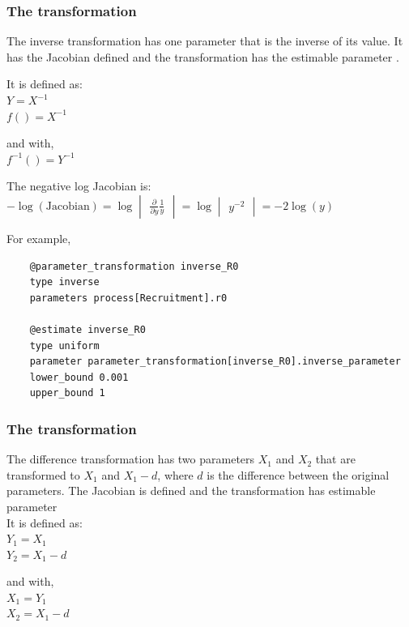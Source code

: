 \subsubsection{The  transformation} \label{sec:Transformation-Inverse}

The inverse transformation has one parameter that is the inverse of its value. It has the Jacobian defined and the transformation has the estimable parameter .

It is defined as: \\
$Y = X^{-1}$ \\
$f() = X^{-1}$

and with,\\
$f^{-1}() = Y^{-1}$

The negative log Jacobian is: \\
$-\log(\text{Jacobian}) = \log \begin{vmatrix} \frac{\partial}{\partial y} \frac{1}{y} \end{vmatrix} = \log \begin{vmatrix} y^{-2}\end{vmatrix} = -2\log(y)$

For example,
{\small{\begin{verbatim}
	@parameter_transformation inverse_R0
	type inverse
	parameters process[Recruitment].r0
	
	@estimate inverse_R0
	type uniform
	parameter parameter_transformation[inverse_R0].inverse_parameter
	lower_bound 0.001
	upper_bound 1
\end{verbatim}}}
	
\subsubsection{The  transformation} \label{sec:Transformation-Difference}

The difference transformation has two parameters $X_1$ and $X_2$ that are transformed to $X_1$ and $X_1 - d$, where $d$ is the difference between the original parameters. The Jacobian is defined and the transformation has estimable parameter \\

It is defined as:\\
$Y_1 = X_1$\\
$Y_2 = X_1 - d$

and with,\\
$X_1 = Y_1$\\
$X_2 = X_1 - d$

